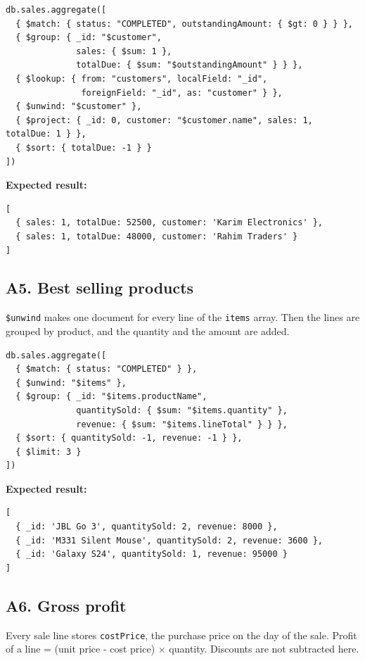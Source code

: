 \documentclass[11pt,a4paper]{article}
\newcommand{\code}[1]{\texttt{#1}}
\begin{document}
\begin{minipage}{\linewidth}
\begin{lstlisting}[style=query]
db.sales.aggregate([
  { $match: { status: "COMPLETED", outstandingAmount: { $gt: 0 } } },
  { $group: { _id: "$customer",
              sales: { $sum: 1 },
              totalDue: { $sum: "$outstandingAmount" } } },
  { $lookup: { from: "customers", localField: "_id",
               foreignField: "_id", as: "customer" } },
  { $unwind: "$customer" },
  { $project: { _id: 0, customer: "$customer.name", sales: 1, totalDue: 1 } },
  { $sort: { totalDue: -1 } }
])
\end{lstlisting}
\end{minipage}

\noindent\textbf{Expected result:}
\begin{lstlisting}[style=result]
[
  { sales: 1, totalDue: 52500, customer: 'Karim Electronics' },
  { sales: 1, totalDue: 48000, customer: 'Rahim Traders' }
]
\end{lstlisting}

\subsection*{A5. Best selling products}
\code{\$unwind} makes one document for every line of the \code{items} array. Then the lines are grouped by product, and the quantity and the amount are added.

\begin{minipage}{\linewidth}
\begin{lstlisting}[style=query]
db.sales.aggregate([
  { $match: { status: "COMPLETED" } },
  { $unwind: "$items" },
  { $group: { _id: "$items.productName",
              quantitySold: { $sum: "$items.quantity" },
              revenue: { $sum: "$items.lineTotal" } } },
  { $sort: { quantitySold: -1, revenue: -1 } },
  { $limit: 3 }
])
\end{lstlisting}
\end{minipage}

\noindent\textbf{Expected result:}
\begin{lstlisting}[style=result]
[
  { _id: 'JBL Go 3', quantitySold: 2, revenue: 8000 },
  { _id: 'M331 Silent Mouse', quantitySold: 2, revenue: 3600 },
  { _id: 'Galaxy S24', quantitySold: 1, revenue: 95000 }
]
\end{lstlisting}

\subsection*{A6. Gross profit}
Every sale line stores \code{costPrice}, the purchase price on the day of the sale. Profit of a line = (unit price - cost price) $\times$ quantity. Discounts are not subtracted here.
\end{document}
